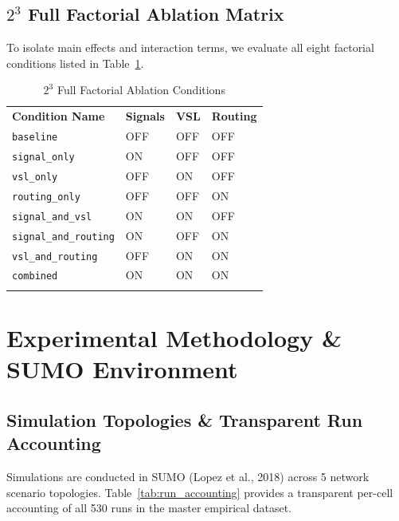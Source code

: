 \documentclass[3p,times,procedia]{elsarticle}
\begin{document}
\subsection{$2^3$ Full Factorial Ablation Matrix}
To isolate main effects and interaction terms, we evaluate all eight factorial conditions listed in Table~\ref{tab:ablation_conditions}.

\begin{table}[htbp]
\caption{$2^3$ Full Factorial Ablation Conditions}
\label{tab:ablation_conditions}
\begin{tabular*}{\hsize}{@{\extracolsep{\fill}}llll@{}}
\toprule
\textbf{Condition Name} & \textbf{Signals} & \textbf{VSL} & \textbf{Routing} \\
\colrule
\texttt{baseline} & OFF & OFF & OFF \\
\texttt{signal\_only} & ON & OFF & OFF \\
\texttt{vsl\_only} & OFF & ON & OFF \\
\texttt{routing\_only} & OFF & OFF & ON \\
\texttt{signal\_and\_vsl} & ON & ON & OFF \\
\texttt{signal\_and\_routing} & ON & OFF & ON \\
\texttt{vsl\_and\_routing} & OFF & ON & ON \\
\texttt{combined} & ON & ON & ON \\
\botrule
\end{tabular*}
\end{table}


\section{Experimental Methodology \& SUMO Environment}
\label{sec:methodology}

\subsection{Simulation Topologies \& Transparent Run Accounting}
Simulations are conducted in SUMO (Lopez et al., 2018) across 5 network scenario topologies. Table~\ref{tab:run_accounting} provides a transparent per-cell accounting of all 530 runs in the master empirical dataset.
\end{document}
